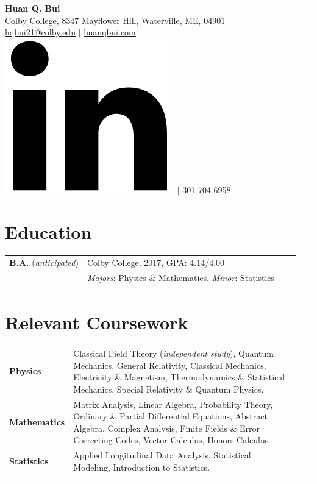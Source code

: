 \documentclass[a4paper, 10.5pt]{article}
\begin{document}
	\begin{center}
		{\LARGE\textbf{Huan Q. Bui}}\\
		\smallskip
		Colby College, 8347 Mayflower Hill, Waterville, ME, 04901\\ \href{mailto:hqbui21@colby.edu}{\underline{hqbui21@colby.edu}} $\vert$ \href{https://huanqbui.com}{\underline{huanqbui.com}} $\vert$ \href{https://www.linkedin.com/in/huan-bui/}{\includegraphics[scale=0.04]{linkedin_logo.PNG}} $\vert$ 301-704-6958
	\end{center}
	\section*{\normalsize{{\color{colby}Education}}}
		\begin{tabular}{lp{12.5cm}lp{8in}}
			\textbf{B.A.} (\textit{anticipated}) & {Colby College}, 2017\textemdash 2021, GPA: 4.14/4.00\\ & \textit{Majors}: Physics \& Mathematics. \textit{Minor}: Statistics\\
		\end{tabular}
	\section*{\normalsize{{\color{colby}Relevant Coursework}}}
	\begin{tabular}{lp{13.5cm}lp{2in}}
		\textbf{Physics} 
		& Classical Field Theory (\textit{independent study}), Quantum Mechanics, General Relativity, Classical Mechanics, Electricity \& Magnetism, Thermodynamics \& Statistical Mechanics, Special Relativity \& Quantum Physics.\\
		
		\textbf{Mathematics} 
		&  Matrix Analysis, Linear Algebra, Probability Theory, Ordinary \& Partial Differential Equations, Abstract Algebra, Complex Analysis, Finite Fields \& Error Correcting Codes, Vector Calculus, Honors Calculus.\\
		
		\textbf{Statistics}
		& Applied Longitudinal Data Analysis, Statistical Modeling, Introduction to Statistics.\\\\ 
	\end{tabular}
\end{document}
